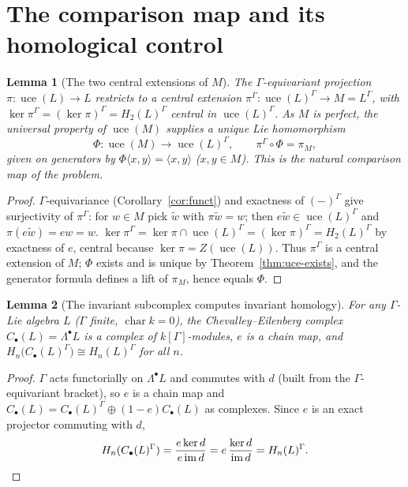 \documentclass{amsart}
\newtheorem{lemma}{Lemma}
\theoremstyle{definition}
\DeclareMathOperator{\uce}{uce}
\DeclareMathOperator{\im}{im}
\newcommand{\Gm}{\Gamma}
\newcommand{\ra}{\rightarrow}
\begin{document}
\section{The comparison map and its homological control}

\begin{lemma}[The two central extensions of $M$]\label{lem:two-ext}
The $\Gm$-equivariant projection $\pi\colon\uce(L)\ra L$ restricts to a central
extension
$\pi^{\Gm}\colon \uce(L)^{\Gm}\ra M=L^{\Gm}$, with
$\ker\pi^{\Gm}=(\ker\pi)^{\Gm}=H_2(L)^{\Gm}$ central in $\uce(L)^{\Gm}$.  As $M$ is
perfect, the universal property of $\uce(M)$ supplies a unique Lie homomorphism
\[
   \Phi\colon\uce(M)\longrightarrow\uce(L)^{\Gm},\qquad \pi^{\Gm}\circ\Phi=\pi_M,
\]
given on generators by $\Phi\langle x,y\rangle=\langle x,y\rangle$ ($x,y\in M$).
This is the natural comparison map of the problem.
\end{lemma}
\begin{proof}
$\Gm$-equivariance (Corollary~\ref{cor:funct}) and exactness of $(-)^{\Gm}$ give
surjectivity of $\pi^{\Gm}$: for $w\in M$ pick $\widetilde w$ with
$\pi\widetilde w=w$; then $e\widetilde w\in\uce(L)^{\Gm}$ and
$\pi(e\widetilde w)=ew=w$.  $\ker\pi^{\Gm}=\ker\pi\cap\uce(L)^{\Gm}=
(\ker\pi)^{\Gm}=H_2(L)^{\Gm}$ by exactness of $e$, central because
$\ker\pi=Z(\uce(L))$.  Thus $\pi^{\Gm}$ is a central extension of $M$; $\Phi$
exists and is unique by Theorem~\ref{thm:uce-exists}, and the generator formula
defines a lift of $\pi_M$, hence equals $\Phi$.
\end{proof}

\begin{lemma}[The invariant subcomplex computes invariant homology]
\label{lem:invariant-complex}
For any $\Gm$-Lie algebra $L$ ($\Gm$ finite, $\operatorname{char}k=0$), the
Chevalley--Eilenberg complex $C_\bullet(L)=\Lambda^\bullet L$ is a complex of
$k[\Gm]$-modules, $e$ is a chain map, and
$H_n\bigl(C_\bullet(L)^{\Gm}\bigr)\cong H_n(L)^{\Gm}$ for all $n$.
\end{lemma}
\begin{proof}
$\Gm$ acts functorially on $\Lambda^\bullet L$ and commutes with $d$ (built from
the $\Gm$-equivariant bracket), so $e$ is a chain map and $C_\bullet(L)=
C_\bullet(L)^{\Gm}\oplus(1-e)C_\bullet(L)$ as complexes.  Since $e$ is an exact
projector commuting with $d$,
\[
   H_n(C_\bullet(L)^{\Gm})=\frac{e\ker d}{e\im d}=e\,\frac{\ker d}{\im d}
   =H_n(L)^{\Gm}.\qedhere
\]
\end{proof}
\end{document}
